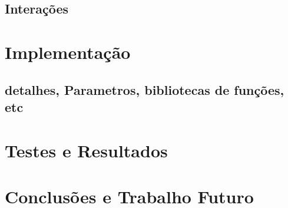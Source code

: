 \documentclass[a4paper]{report}
\begin{document}
\section{Interações}

\chapter{Implementação}
\section{detalhes, Parametros, bibliotecas de funções, etc}

\chapter{Testes e Resultados}

\chapter{Conclusões e Trabalho Futuro}
\end{document}
